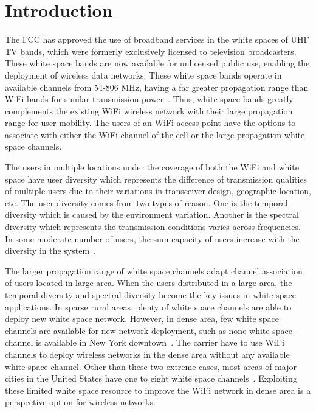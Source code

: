 \section{Introduction}
\label{sec:introduction}

The FCC has approved the use of broadband services in the white spaces of UHF TV bands, 
which were formerly exclusively licensed to television broadcasters. These white space 
bands are now available for unlicensed public use, enabling the deployment of wireless 
data networks. These white space bands operate in available channels from 54-806 MHz, 
having a far greater propagation range than WiFi bands for similar transmission power~\cite{balanis2012antenna}. 
Thus, white space bands greatly complements the existing WiFi wireless network with 
their large propagation range for user mobility. 
The users of an WiFi access point have the options to associate with either the WiFi channel 
of the cell or the large propagation white space channels.

The users in multiple locations under the coverage of both the WiFi and white space have user 
diversity which represents the difference of transmission qualities of multiple users due to 
their variations in transceiver design, geographic location, etc.
The user diversity comes from two types of reason. One is the temporal diversity which 
is caused by the environment variation. Another is the spectral diversity which represents 
the transmission conditions varies across frequencies. 
In some moderate number of users, the sum capacity of users increase with the diversity in 
the system~\cite{gan2014multiple}. 

The larger propagation range of white space channels adapt channel association of users located 
in large area. When the users distributed in a large area, the temporal diversity and spectral 
diversity become the key issues in white space applications. 
In sparse rural areas, plenty of white space channels are able to deploy new white space network. 
However, in dense area, few white space channels are available for new network deployment, such as 
none white space channel is available in New York downtown~\cite{googlespectrum}. The carrier have 
to use WiFi channels to deploy wireless networks in the dense area without any available white space channel. 
Other than these two extreme cases, most areas of major cities in the United States have one to eight 
white space channels~\cite{googlespectrum}. Exploiting these limited white space resource to improve 
the WiFi network in dense area is a perspective option for wireless networks. 

